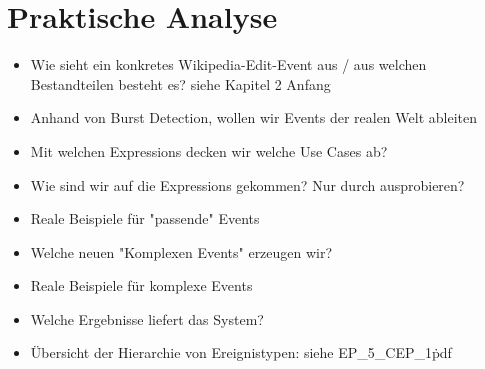 \section{Praktische Analyse}

\begin{itemize}
    \item Wie sieht ein konkretes Wikipedia-Edit-Event aus / aus welchen Bestandteilen besteht es?
        siehe \cite{10.1007978-3-642-36973-5_22} Kapitel 2 Anfang
    \item Anhand von Burst Detection, wollen wir Events der realen Welt ableiten \cite{Zhu:2003:EEB:956750.956789}
    \item Mit welchen Expressions decken wir welche Use Cases ab?
    \item Wie sind wir auf die Expressions gekommen? Nur durch ausprobieren?
    \item Reale Beispiele für "passende" Events
    \item Welche neuen "Komplexen Events" erzeugen wir?
    \item Reale Beispiele für komplexe Events
    \item Welche Ergebnisse liefert das System?
    \item Übersicht der Hierarchie von Ereignistypen: siehe EP\_5\_CEP\_1\.pdf
\end{itemize}